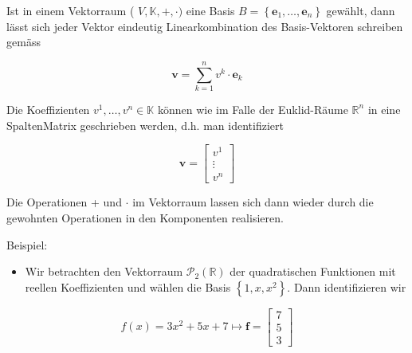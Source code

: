 \documentclass[10pt]{article}
\begin{document}
Ist in einem Vektorraum ( $V, \mathbb{K},+, \cdot)$ eine Basis $B=\left\{\mathbf{e}_{1}, \ldots, \mathbf{e}_{n}\right\}$ gewählt, dann lässt sich jeder Vektor eindeutig Linearkombination des Basis-Vektoren schreiben gemäss


\begin{equation*}
\mathbf{v}=\sum_{k=1}^{n} v^{k} \cdot \mathbf{e}_{k} \tag{7.27}
\end{equation*}


Die Koeffizienten $v^{1}, \ldots, v^{n} \in \mathbb{K}$ können wie im Falle der Euklid-Räume $\mathbb{R}^{n}$ in eine SpaltenMatrix geschrieben werden, d.h. man identifiziert

\[
\mathbf{v}=\left[\begin{array}{c}
v^{1}  \tag{7.28}\\
\vdots \\
v^{n}
\end{array}\right]
\]

Die Operationen + und $\cdot$ im Vektorraum lassen sich dann wieder durch die gewohnten Operationen in den Komponenten realisieren.

Beispiel:

\begin{itemize}
  \item Wir betrachten den Vektorraum $\mathcal{P}_{2}(\mathbb{R})$ der quadratischen Funktionen mit reellen Koeffizienten und wählen die Basis $\left\{1, x, x^{2}\right\}$. Dann identifizieren wir
\end{itemize}

\[
f(x)=3 x^{2}+5 x+7 \mapsto \mathbf{f}=\left[\begin{array}{l}
7  \tag{7.29}\\
5 \\
3
\end{array}\right]
\]
\end{document}
